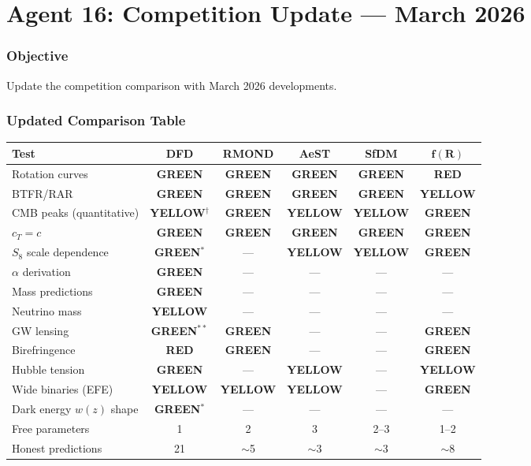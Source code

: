 \documentclass[11pt,a4paper]{article}
\newcommand{\GREEN}{\textcolor{dfdgreen}{\textbf{GREEN}}}
\newcommand{\YELLOW}{\textcolor{dfdyellow}{\textbf{YELLOW}}}
\newcommand{\RED}{\textcolor{dfdred}{\textbf{RED}}}
\begin{document}
\part{Agent 16: Competition Update --- March 2026}
\label{part:competition}

\section{Objective}

Update the competition comparison with March 2026 developments.

\section{Updated Comparison Table}

\begin{center}
\begin{longtable}{p{3.5cm}ccccc}
\toprule
\textbf{Test} & \textbf{DFD} & \textbf{RMOND} & \textbf{AeST} & \textbf{SfDM} & $\mathbf{f(R)}$ \\
\midrule
Rotation curves & \GREEN & \GREEN & \GREEN & \GREEN & \RED \\
BTFR/RAR & \GREEN & \GREEN & \GREEN & \GREEN & \YELLOW \\
CMB peaks (quantitative) & \YELLOW$^\dagger$ & \GREEN & \YELLOW & \YELLOW & \GREEN \\
$c_T = c$ & \GREEN & \GREEN & \GREEN & \GREEN & \GREEN \\
$S_8$ scale dependence & \GREEN$^*$ & --- & \YELLOW & \YELLOW & \GREEN \\
$\alpha$ derivation & \GREEN & --- & --- & --- & --- \\
Mass predictions & \GREEN & --- & --- & --- & --- \\
Neutrino mass & \YELLOW & --- & --- & --- & --- \\
GW lensing & \GREEN$^{**}$ & \GREEN & --- & --- & \GREEN \\
Birefringence & \RED & \GREEN & --- & --- & \GREEN \\
Hubble tension & \GREEN & --- & \YELLOW & --- & \YELLOW \\
Wide binaries (EFE) & \YELLOW & \YELLOW & \YELLOW & --- & \GREEN \\
Dark energy $w(z)$ shape & \GREEN$^*$ & --- & --- & --- & --- \\
Free parameters & 1 & 2 & 3 & 2--3 & 1--2 \\
Honest predictions & 21 & $\sim$5 & $\sim$3 & $\sim$3 & $\sim$8 \\
\bottomrule
\end{longtable}
\end{center}
\end{document}
